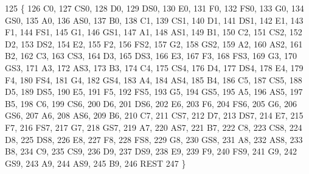 \begin{DoxyCode}
125     \{
126         C0,
127         CS0,
128         D0,
129         DS0,
130         E0,
131         F0,
132         FS0,
133         G0,
134         GS0,
135         A0,
136         AS0,
137         B0,
138         C1,
139         CS1,
140         D1,
141         DS1,
142         E1,
143         F1,
144         FS1,
145         G1,
146         GS1,
147         A1,
148         AS1,
149         B1,
150         C2,
151         CS2,
152         D2,
153         DS2,
154         E2,
155         F2,
156         FS2,
157         G2,
158         GS2,
159         A2,
160         AS2,
161         B2,
162         C3,
163         CS3,
164         D3,
165         DS3,
166         E3,
167         F3,
168         FS3,
169         G3,
170         GS3,
171         A3,
172         AS3,
173         B3,
174         C4,
175         CS4,
176         D4,
177         DS4,
178         E4,
179         F4,
180         FS4,
181         G4,
182         GS4,
183         A4,
184         AS4,
185         B4,
186         C5,
187         CS5,
188         D5,
189         DS5,
190         E5,
191         F5,
192         FS5,
193         G5,
194         GS5,
195         A5,
196         AS5,
197         B5,
198         C6,
199         CS6,
200         D6,
201         DS6,
202         E6,
203         F6,
204         FS6,
205         G6,
206         GS6,
207         A6,
208         AS6,
209         B6,
210         C7,
211         CS7,
212         D7,
213         DS7,
214         E7,
215         F7,
216         FS7,
217         G7,
218         GS7,
219         A7,
220         AS7,
221         B7,
222         C8,
223         CS8,
224         D8,
225         DS8,
226         E8,
227         F8,
228         FS8,
229         G8,
230         GS8,
231         A8,
232         AS8,
233         B8,
234         C9,
235         CS9,
236         D9,
237         DS9,
238         E9,
239         F9,
240         FS9,
241         G9,
242         GS9,
243         A9,
244         AS9,
245         B9,
246         REST
247     \}
\end{DoxyCode}
